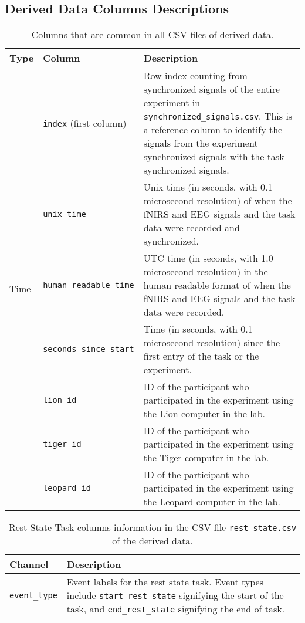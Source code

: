 \subsection{Derived Data Columns Descriptions}
\label{sec:derived_data_cols_desc}


\begin{table}[h]
\centering
\begin{tabularx}{\textwidth}{|l|l|X|}
\hline
\textbf{Type} & \textbf{Column} & \textbf{Description} \\
\hline
\multirow{13}{*}{\parbox{2cm}{Time}}
& \texttt{index} (first column) & Row index counting from synchronized signals of the entire experiment in \texttt{synchronized\_signals.csv}. This is a reference column to identify the signals from the experiment synchronized signals with the task synchronized signals.\\
& \texttt{unix\_time} & Unix time (in seconds, with 0.1 microsecond resolution) of when the fNIRS and EEG signals and the task data were recorded and synchronized.\\
& \texttt{human\_readable\_time} & UTC time (in seconds, with 1.0 microsecond resolution) in the human readable format of when the fNIRS and EEG signals and the task data were recorded.\\
& \texttt{seconds\_since\_start} & Time (in seconds, with 0.1 microsecond resolution) since the first entry of the task or the experiment.\\
\hline
\multirow{6}{*}{\parbox{2cm}{Subject ID}}
& \texttt{lion\_id} & ID of the participant who participated in the experiment using the Lion computer in the lab.\\
& \texttt{tiger\_id} & ID of the participant who participated in the experiment using the Tiger computer in the lab.\\
& \texttt{leopard\_id} & ID of the participant who participated in the experiment using the Leopard computer in the lab.\\
\hline
\end{tabularx}
\caption{Columns that are common in all CSV files of derived data.}
\label{tab:shared_columns}
\end{table}

\begin{table}[h]
\centering
\begin{tabularx}{\textwidth}{|l|X|}
\hline
\textbf{Channel} & \textbf{Description} \\
\hline
\texttt{event\_type} & Event labels for the rest state task. Event types include \texttt{start\_rest\_state} signifying the start of the task, and \texttt{end\_rest\_state} signifying the end of task.\\
\hline
\end{tabularx}
\caption{Rest State Task columns information in the CSV file \texttt{rest\_state.csv} of the derived data.}
\label{tab:rest_task_columns}
\end{table}

